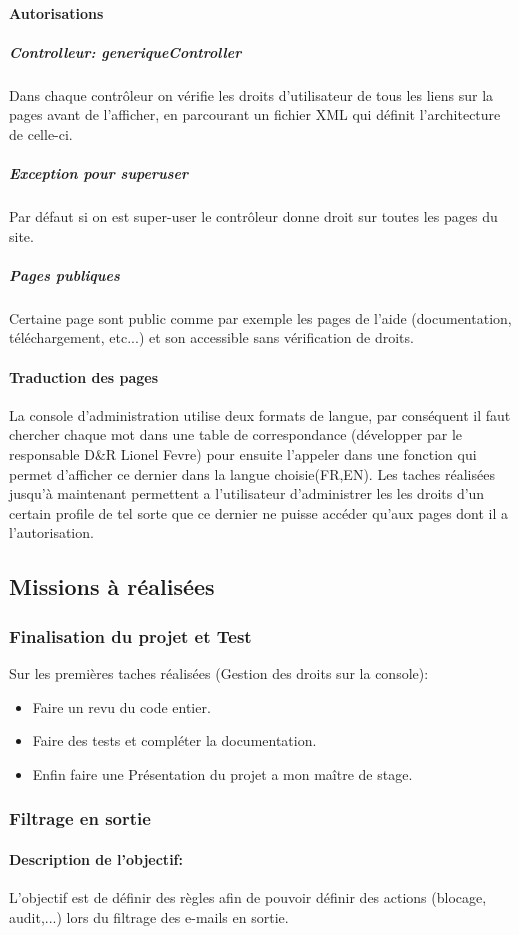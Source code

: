 \paragraph{Autorisations}
\subparagraph{Controlleur: generiqueController} 
Dans chaque contrôleur on vérifie les droits d’utilisateur de tous les liens sur la pages avant de l’afficher, en parcourant
un fichier XML qui définit l’architecture de celle-ci.
\subparagraph{Exception pour superuser}
Par défaut si on est super-user le contrôleur donne droit sur toutes les pages du site.
\subparagraph{Pages publiques} 
Certaine page sont public comme par exemple les pages de l'aide (documentation, téléchargement, etc...) et son
accessible sans vérification de droits.

\paragraph{Traduction des pages}
La console d'administration utilise deux formats de langue, par conséquent il faut chercher chaque mot dans une table de correspondance (développer par le responsable D\&R Lionel Fevre) pour ensuite l'appeler dans une fonction qui permet d'afficher ce dernier dans la langue choisie(FR,EN).
Les taches réalisées jusqu’à maintenant permettent a l'utilisateur d'administrer les les droits d'un certain profile de tel sorte que ce dernier ne puisse accéder qu'aux pages  dont il a l'autorisation. 
\subsection{Missions à réalisées}
\subsubsection{Finalisation du projet et Test}
Sur les premières taches réalisées (Gestion des droits sur la console):
\begin{itemize}
\item Faire un revu du code entier.
\item Faire des tests et compléter la documentation.
\item Enfin faire une Présentation du projet a mon  maître de stage. 
\end{itemize}
\subsubsection{Filtrage en sortie}
\paragraph{Description de l'objectif:} L'objectif est de définir des règles afin de pouvoir définir des actions (blocage, audit,...) lors du filtrage des e-mails en sortie.
